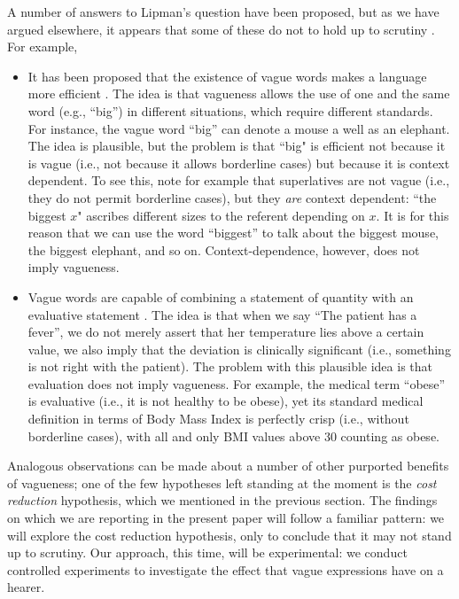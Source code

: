 A number of answers to Lipman's question have been proposed, but as we have argued elsewhere, it appears that some of these do not to hold up to scrutiny \citep{van2009utility,vanDeemterBook}. For example,
%
\begin{itemize}
\item It has been proposed that the existence of vague words makes a language more efficient \citep{barwiseperry}. The idea is that vagueness allows the use of one and the same word (e.g., ``big'') in different situations, which require different standards. For instance, the vague word ``big'' can denote a mouse a well as an elephant. The idea is plausible, but the problem is that ``big" is efficient not because it is vague (i.e., not because it allows borderline cases) but because it is context dependent. To see this, note for example that superlatives are not vague (i.e., they do not permit borderline cases), but they {\em are} context dependent: ``the biggest $x$" ascribes different sizes to the referent depending on $x$. It is for this reason that we can use the word ``biggest''  to talk about the biggest mouse, the biggest elephant, and so on. Context-dependence, however, does not imply vagueness.
%
\item Vague words are capable of combining a statement of quantity with an evaluative statement \citep{veltman}. The idea is that when we say ``The patient has a fever'', we do not merely assert that her temperature lies above a certain value, we also imply that the deviation is clinically significant (i.e., something is not right with the patient). The problem with this plausible idea is that evaluation does not imply vagueness. For example, the medical term ``obese'' is evaluative (i.e., it is not healthy to be obese), yet its standard medical definition in terms of Body Mass Index is perfectly crisp (i.e., without borderline cases), with all and only BMI values above 30 counting as obese.
\end{itemize}
%
Analogous observations can be made about a number of other purported benefits of vagueness; one of the few hypotheses left standing at the moment is the {\em cost reduction} hypothesis, which we mentioned in the previous section. The findings on which we are reporting in the present paper will follow a familiar pattern: we will explore the cost reduction hypothesis, only to conclude that it may not stand up to scrutiny. Our approach, this time, will be experimental: we conduct controlled experiments to investigate the effect that vague expressions have on a hearer. 

